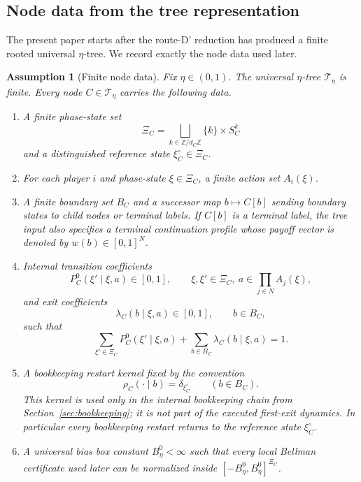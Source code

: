 \documentclass[12pt]{article}
\newtheorem{assumption}[theorem]{Assumption}
\theoremstyle{definition}
\newcommand{\1}{\mathbf{1}}
\newcommand{\cT}{\mathcal{T}}
\begin{document}
\subsection{Node data from the tree representation}

The present paper starts after the route-D' reduction has produced a finite rooted
universal $\eta$-tree. We record exactly the node data used later.

\begin{assumption}[Finite node data]
\label{ass:node-data}
Fix $\eta\in(0,1)$. The universal $\eta$-tree $\cT_\eta$ is finite. Every node
$C\in \cT_\eta$ carries the following data.
\begin{enumerate}[label=\textnormal{(D\arabic*)},leftmargin=2.8em]
\item A finite phase-state set
\[
\Xi_C=\bigsqcup_{k\in\mathbb Z/d_C\mathbb Z}\{k\}\times S_C^k
\]
and a distinguished reference state $\xi_C^\circ\in\Xi_C$.
\item For each player $i$ and phase-state $\xi\in\Xi_C$, a finite action set
$A_i(\xi)$.
\item A finite boundary set $B_C$ and a successor map $b\mapsto C[b]$ sending
boundary states to child nodes or terminal labels. If $C[b]$ is a terminal
label, the tree input also specifies a terminal continuation profile whose
payoff vector is denoted by $w(b)\in[0,1]^N$.
\item Internal transition coefficients
\[
P_C^0(\xi'\mid \xi,a)\in[0,1],
\qquad \xi,\xi'\in \Xi_C,
\ a\in \prod_{j\in N}A_j(\xi),
\]
and exit coefficients
\[
\lambda_C(b\mid \xi,a)\in[0,1],
\qquad b\in B_C,
\]
such that
\[
\sum_{\xi'\in\Xi_C}P_C^0(\xi'\mid \xi,a)+\sum_{b\in B_C}\lambda_C(b\mid\xi,a)=1.
\]
\item A bookkeeping restart kernel fixed by the convention
\[
\rho_C(\cdot\mid b)=\delta_{\xi_C^\circ}
\qquad (b\in B_C).
\]
This kernel is used only in the internal bookkeeping chain from
Section~\ref{sec:bookkeeping}; it is not part of the executed first-exit
dynamics. In particular every bookkeeping restart returns to the reference
state $\xi_C^\circ$.
\item A universal bias box constant $B_\eta^0<\infty$ such that every local
Bellman certificate used later can be normalized inside
$[-B_\eta^0,B_\eta^0]^{\Xi_C}$.
\end{enumerate}
\end{assumption}
\end{document}

